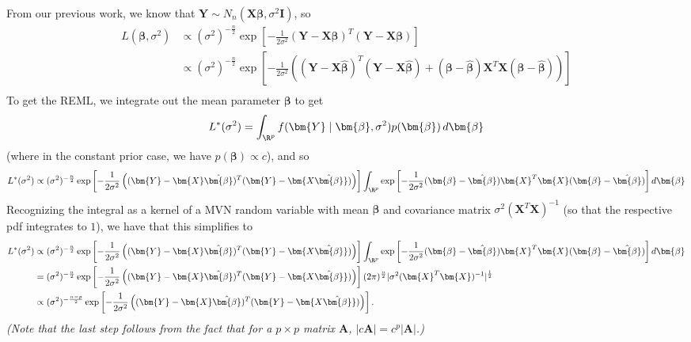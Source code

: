\begin{enumerate}[a)]
From our previous work, we know that $\bm{Y} \sim N_n(\bm{X\beta}, \sigma^2\bm{I})$, so
\begin{align*}
    L(\bm{\beta}, \sigma^2) &\propto (\sigma^2)^{-\frac{n}{2}} \exp \left[ -\frac{1}{2\sigma^2} (\bm{Y} - \bm{X}\bm{\beta})^T (\bm{Y} - \bm{X}\bm{\beta})\right] \\
    & \propto (\sigma^2)^{-\frac{n}{2}} \exp \left[ -\frac{1}{2\sigma^2} \left( (\bm{Y} - \bm{X}\hat{\bm{\beta}})^T(\bm{Y} - \bm{X\hat{\bm{\beta}}}) + (\bm{\beta} - \hat{\bm{\beta}})\bm{X}^T\bm{X}(\bm{\beta} - \hat{\bm{\beta}}) \right) \right] \\
\end{align*}
To get the REML, we integrate out the mean parameter $\bm{\beta}$ to get
\[
    L^*(\sigma^2) = \int_{\R^p} f(\bm{Y} \mid \bm{\beta}, \sigma^2) p(\bm{\beta}) \, d\bm{\beta}
\]
(where in the constant prior case, we have $p(\bm{\beta}) \propto c$), and so
\begin{align*}
    L^*(\sigma^2) &\propto (\sigma^2)^{-\frac{n}{2}}  \exp \left[ -\frac{1}{2\sigma^2} \left( (\bm{Y} - \bm{X}\hat{\bm{\beta}})^T(\bm{Y} - \bm{X\hat{\bm{\beta}}}) \right) \right] 
    \int_{\R^p} \exp \left[ -\frac{1}{2\sigma^2} (\bm{\beta} - \hat{\bm{\beta}})\bm{X}^T\bm{X}(\bm{\beta} - \hat{\bm{\beta}}) \right] d\bm{\beta} \\
\end{align*}
Recognizing the integral as a kernel of a MVN random variable with mean $\bm{\beta}$ and covariance matrix $\sigma^2(\bm{X}^T\bm{X})^{-1}$ (so that the respective pdf integrates to $1$), we have that this simplifies to
\begin{align*}
    L^*(\sigma^2) &\propto (\sigma^2)^{-\frac{n}{2}}  \exp \left[ -\frac{1}{2\sigma^2} \left( (\bm{Y} - \bm{X}\hat{\bm{\beta}})^T(\bm{Y} - \bm{X\hat{\bm{\beta}}}) \right) \right] 
    \int_{\R^p} \exp \left[ -\frac{1}{2\sigma^2} (\bm{\beta} - \hat{\bm{\beta}})\bm{X}^T\bm{X}(\bm{\beta} - \hat{\bm{\beta}}) \right] d\bm{\beta} \\
    &= (\sigma^2)^{-\frac{n}{2}}  \exp \left[ -\frac{1}{2\sigma^2} \left( (\bm{Y} - \bm{X}\hat{\bm{\beta}})^T(\bm{Y} - \bm{X\hat{\bm{\beta}}}) \right) \right] (2\pi)^{\frac{n}{2}} |\sigma^2(\bm{X}^T\bm{X})^{-1}|^{\frac{1}{2}} \\
    & \propto (\sigma^2)^{-\frac{n - p}{2}}  \exp \left[ -\frac{1}{2\sigma^2} \left( (\bm{Y} - \bm{X}\hat{\bm{\beta}})^T(\bm{Y} - \bm{X\hat{\bm{\beta}}}) \right) \right].
\end{align*}
\textit{(Note that the last step follows from the fact that for a $p \times p$ matrix $\bm{A}$, $|c\bm{A}| = c^p |\bm{A}|$.)} \\


\end{enumerate}
